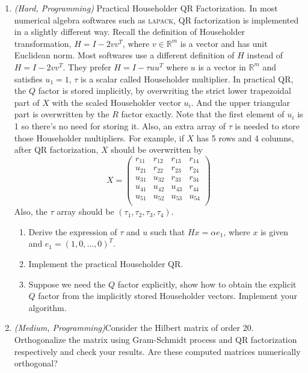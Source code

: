 \documentclass[a4paper]{article}
\begin{document}
\begin{enumerate}
\item \emph{(Hard, Programming)} Practical Householder QR Factorization. In most
numerical algebra softwares such as \textsc{lapack}, QR factorization is implemented
in a slightly different way. Recall the definition of Householder transformation,
$H=I-2vv^T$, where $v\in\mathbb{R}^{m}$ is a vector and has unit Euclidean norm.
Most softwares use a different definition of $H$ instead of $H=I-2vv^T$. They prefer
$H=I-\tau uu^T$ where $u$ is a vector in $\mathbb{R}^{m}$ and satisfies $u_1=1$,
$\tau$ is a scalar called Householder multiplier. In practical QR, the $Q$ factor
is stored implicitly, by overwriting the strict lower trapezoidal part of $X$ with
the scaled Householder vector $u_i$. And the upper triangular part is overwritten
by the $R$ factor exactly. Note that the first element of $u_i$ is 1 so
there's no need for storing it. Also, an extra array of $\tau$ is needed to store
those Householder multipliers. For example, if $X$ has 5 rows and 4 columns, after
QR factorization, $X$ should be overwritten by
\[
X=\left(\begin{array}{cccc}
r_{11} & r_{12} & r_{13} & r_{14} \\
u_{21} & r_{22} & r_{23} & r_{24} \\
u_{31} & u_{32} & r_{33} & r_{34} \\
u_{41} & u_{42} & u_{43} & r_{44} \\
u_{51} & u_{52} & u_{53} & u_{54} \\
\end{array}
\right)
\]
Also, the $\tau$ array should be $(\tau_1, \tau_2, \tau_3, \tau_4)$.
\begin{enumerate}
\item Derive the expression of $\tau$ and $u$ such that $Hx=\alpha e_1$, where
$x$ is given and $e_1=(1, 0, \ldots, 0)^T$.
\item Implement the practical Householder QR.
\item Suppose we need the $Q$ factor explicitly, show how to obtain the explicit
$Q$ factor from the implicitly stored Householder vectors. Implement your algorithm.
\end{enumerate}
\item \emph{(Medium, Programming)}Consider the Hilbert matrix of order 20. Orthogonalize
the matrix using Gram-Schmidt process and QR factorization respectively and check
your results. Are these computed matrices numerically orthogonal?
\end{enumerate}
\end{document}
